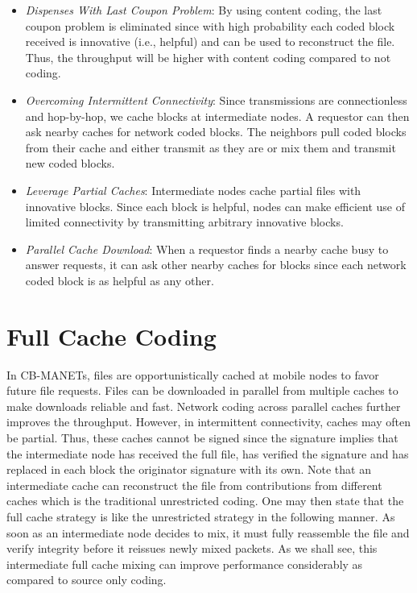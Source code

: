 \begin{itemize}
  \item \emph{Dispenses With Last Coupon Problem}: By using content coding, the last coupon problem is eliminated since with high probability each coded block received is innovative (i.e., helpful) and can be used to reconstruct the file. Thus, the throughput will be higher with content coding compared to not coding. 
\item \emph{Overcoming Intermittent Connectivity}: Since transmissions are connectionless and hop-by-hop, we cache blocks at intermediate nodes. A requestor can then ask nearby caches for network coded blocks. The neighbors pull coded blocks from their cache and either transmit as they are or mix them and transmit new coded blocks.
  \item \emph{Leverage Partial Caches}: Intermediate nodes cache partial files with innovative blocks. Since each block is helpful, nodes can make efficient use of limited connectivity by transmitting arbitrary innovative blocks.
   \item \emph{Parallel Cache Download}: When a requestor finds a nearby cache busy to answer requests, it can ask other nearby caches for blocks since each network coded block is as helpful as any other.
\end{itemize}


\section{Full Cache Coding}
In CB-MANETs, files are opportunistically cached at mobile nodes to favor future file requests. Files can be downloaded in parallel from multiple caches to make downloads reliable and fast. Network coding across parallel caches further improves the throughput. However, in intermittent connectivity, caches may often be partial. Thus, these caches cannot be signed since the signature implies that the intermediate node has received the full file, has verified the signature and has replaced in each block the originator signature with its own.  Note that an intermediate cache can reconstruct the file from contributions from different caches which is the traditional unrestricted coding. One may then state that the full cache strategy is like the unrestricted strategy in the following manner. As soon as an intermediate node decides to mix, it must fully reassemble the file and verify integrity before it reissues newly mixed packets. As we shall see, this intermediate full cache mixing can improve performance considerably as compared to source only coding.

